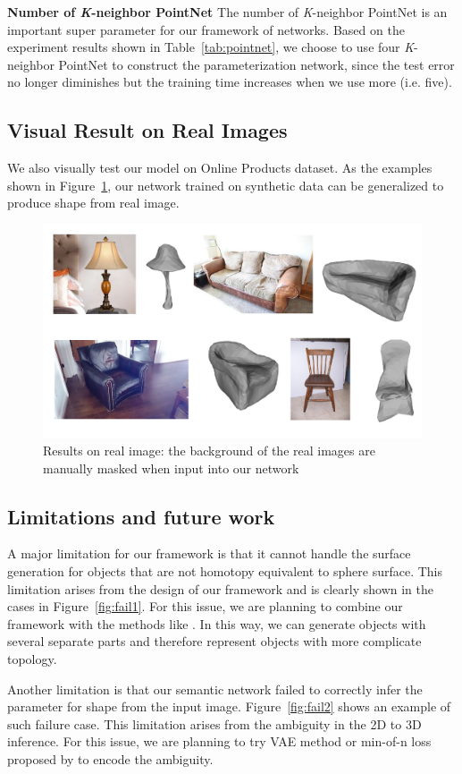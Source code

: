 \noindent\textbf{Number of \textit{K}-neighbor PointNet}
The number of \textit{K}-neighbor PointNet is an important super parameter for our framework of networks. Based on the experiment results shown in Table~\ref{tab:pointnet}, we choose to use four \textit{K}-neighbor PointNet to construct the parameterization network, since the test error no longer diminishes but the training time increases when we use more (i.e. five).

\subsection{Visual Result on Real Images}
We also visually test our model on  Online Products dataset\cite{songCVPR16}. As the examples shown in Figure~\ref{fig:real}, our network trained on synthetic data can be generalized to produce shape from real image.

\begin{figure}[htbp]
	\centering
	\includegraphics[width=\linewidth]{img/real/real}
	\caption{Results on real image: the background of the real images are manually masked when input into our network}
	\label{fig:real}
\end{figure}

\subsection{Limitations and future work}
A major limitation for our framework is that it cannot handle the surface generation for objects that are not homotopy equivalent to sphere surface. This limitation arises from the design of our framework and is clearly shown in the cases in Figure~\ref{fig:fail1}. For this issue, we are planning to combine our framework with the methods like \cite{assemble,im2struct}. In this way, we can generate objects with several separate parts and therefore represent objects with more complicate topology.

Another limitation is that our semantic network failed to correctly infer the parameter for shape from the input image. Figure~\ref{fig:fail2} shows an example of such failure case. This limitation arises from the ambiguity in the 2D to 3D inference. For this issue, we are planning to try VAE method\cite{VAE} or min-of-n loss proposed by \cite{PSGN} to encode the ambiguity.  

